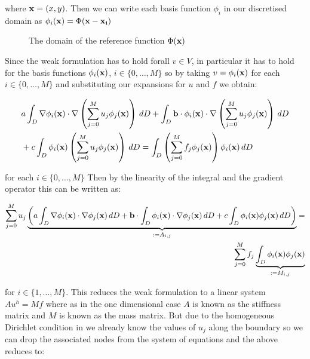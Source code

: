 where $\mathbf{x} = (x, y)$. Then we can write each basis function $\phi_i$ in our
discretised domain as $\phi_i(\mathbf{x}) = \Phi(\mathbf{x} - \mathbf{x_i})$

\begin{figure}
\centering

\caption{The domain of the reference function $\Phi(\mathbf{x})$}
\label{fig:reference-function-domain}
\end{figure}

Since the weak formulation  has to hold forall
$v \in V$, in particular it has to hold for the basis functions
$\phi_i(\mathbf{x})$, $i \in \{0,\ldots,M\}$ so by taking $v = \phi_i(\mathbf{x})$ for
each $i \in \{0, \ldots, M\}$ and substituting our expansions for $u$ and $f$
we obtain:

\begin{align}
\begin{split}
    &a\int_{D}\nabla\phi_i(\mathbf{x}) \cdot
                  \nabla\left(\sum_{j = 0}^Mu_j\phi_j(\mathbf{x})\right)\, dD
    +\int_{D}\mathbf{b}\cdot\phi_i(\mathbf{x})\cdot
                  \nabla\left(\sum_{j = 0}^Mu_j\phi_j(\mathbf{x})\right)\, dD \\
    &+c\int_{D}\phi_i(\mathbf{x})
                    \left(\sum_{j = 0}^Mu_j\phi_j(\mathbf{x})\right)\, dD =
    \int_{D}\left(\sum_{j = 0}^Mf_j\phi_j(\mathbf{x})\right)
                 \phi_i(\mathbf{x})\, dD
\end{split}
\end{align}

for each $i \in \{0, \ldots, M\}$ Then by the linearity of the integral and the
gradient operator this can be written as:

\begin{align}\label{eq:twod-deterministic-discrete}
  \begin{split}
    \sum_{j=0}^Mu_j
      \underbrace{\left(
         a\int_{D}\nabla\phi_i(\mathbf{x})\cdot\nabla\phi_j(\mathbf{x})\, dD
         + \mathbf{b}\cdot\int_{D}\phi_i(\mathbf{x})\cdot\nabla\phi_j(\mathbf{x})\, dD
         +c\int_{D}\phi_i(\mathbf{x})\phi_j(\mathbf{x})\, dD
      \right)}_{:= A_{i,j}} = \\
    \sum_{j=0}^Mf_j
      \underbrace{\int_{D}\phi_i(\mathbf{x})\phi_j(\mathbf{x})}_{:= M_{i,j}}
  \end{split}
\end{align}

for $i \in \{1,\ldots,M\}$. This reduces the weak formulation
 to a linear system $Au^h = Mf$ where as in the
one dimensional case $A$ is known as the stiffness matrix and $M$ is known as
the mass matrix. But due to the homogeneous Dirichlet condition in
 we already know the values of $u_j$ along the
boundary so we can drop the associated nodes from the system of equations and
the above reduces to:

